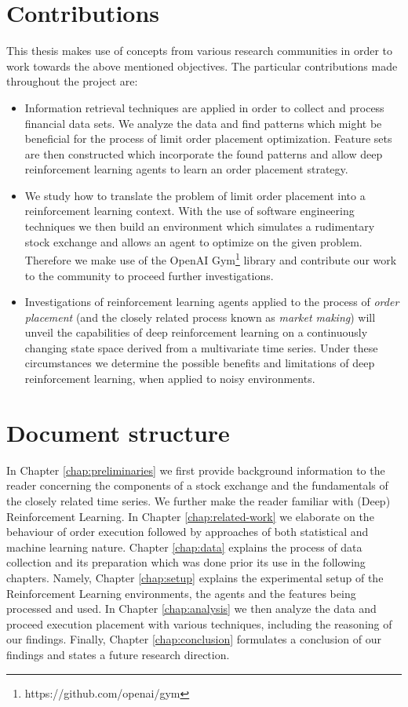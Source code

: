 \section{Contributions}

This thesis makes use of concepts from various research communities in order to work towards the above mentioned objectives.
The particular contributions made throughout the project are:
\begin{itemize}
    \item Information retrieval techniques are applied in order to collect and process financial data sets.
    We analyze the data and find patterns which might be beneficial for the process of limit order placement optimization.
    Feature sets are then constructed which incorporate the found patterns and allow deep reinforcement learning agents to learn an order placement strategy.
    \item We study how to translate the problem of limit order placement into a reinforcement learning context.
    With the use of software engineering techniques we then build an environment which simulates a rudimentary stock exchange and allows an agent to optimize on the given problem.
    Therefore we make use of the OpenAI Gym\footnote{https://github.com/openai/gym} library and contribute our work to the community to proceed further investigations.
    \item Investigations of reinforcement learning agents applied to the process of \textit{order placement} (and the closely related process known as \textit{market making}) will unveil the capabilities of deep reinforcement learning on a continuously changing state space derived from a multivariate time series.
    Under these circumstances we determine the possible benefits and limitations of deep reinforcement learning, when applied to noisy environments.
\end{itemize}

\section{Document structure}

In Chapter \ref{chap:preliminaries} we first provide background information to the reader concerning the components of a stock exchange and the fundamentals of the closely related time series.
We further make the reader familiar with (Deep) Reinforcement Learning.
In Chapter \ref{chap:related-work} we elaborate on the behaviour of order execution followed by approaches of both statistical and machine learning nature.
Chapter \ref{chap:data} explains the process of data collection and its preparation which was done prior its use in the following chapters.
Namely, Chapter \ref{chap:setup} explains the experimental setup of the Reinforcement Learning environments, the agents and the features being processed and used.
In Chapter \ref{chap:analysis} we then analyze the data and proceed execution placement with various techniques, including the reasoning of our findings.
Finally, Chapter \ref{chap:conclusion} formulates a conclusion of our findings and states a future research direction.

